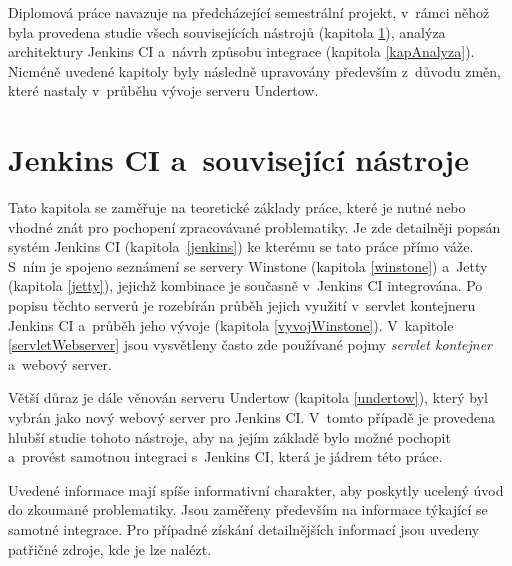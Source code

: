     Diplomová práce navazuje na předcházející semestrální projekt, v~rámci něhož byla provedena studie všech
    souvisejících nástrojů (kapitola \ref{kapJenkins}),  analýza architektury Jenkins CI
    a~návrh způsobu integrace (kapitola \ref{kapAnalyza}). Nicméně uvedené kapitoly byly následně
    upravovány především z~důvodu změn, které nastaly v~průběhu vývoje serveru Undertow.
    

    



\chapter{Jenkins CI a~související nástroje} \label{kapJenkins}
    Tato kapitola se zaměřuje na teoretické základy práce, které je nutné nebo vhodné znát pro pochopení zpracovávané problematiky.
    Je zde detailněji popsán systém Jenkins CI (kapitola~\ref{jenkins}) ke kterému se tato práce přímo váže. S~ním je spojeno seznámení
    se servery Winstone (kapitola \ref{winstone}) a~Jetty (kapitola \ref{jetty}), jejichž kombinace je současně v~Jenkins CI integrována.
    Po popisu těchto serverů je rozebírán průběh jejich využití v~servlet kontejneru Jenkins CI a~průběh jeho vývoje (kapitola \ref{vyvojWinstone}). 
    V~kapitole \ref{servletWebserver} jsou vysvětleny často zde používané pojmy \emph{servlet kontejner} a~webový server.

    Větší důraz je dále věnován serveru Undertow (kapitola \ref{undertow}), který byl vybrán jako nový webový server pro Jenkins CI. V~tomto případě je provedena hlubší studie
    tohoto nástroje, aby na jejím základě bylo možné pochopit a~provést samotnou integraci s~Jenkins CI, která je jádrem této práce. 

    Uvedené informace mají spíše informativní charakter, aby poskytly ucelený úvod do zkoumané problematiky. Jsou zaměřeny především na informace týkající se samotné
    integrace. Pro případné získání detailnějších informací jsou uvedeny patřičné zdroje, kde je lze nalézt.

